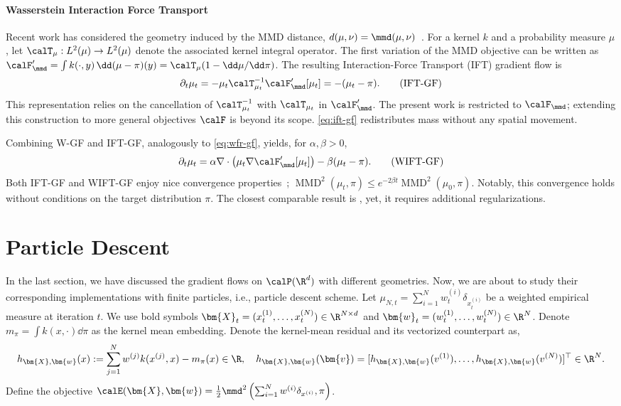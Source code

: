 \paragraph{Wasserstein Interaction Force Transport}
Recent work has considered the geometry induced by the MMD distance, $d(\mu,\nu)=\mmd(\mu,\nu)$~\citep{zhu2024inclusive,zhu2024kernel,gladin2024interaction}. For a kernel $k$ and a probability measure $\mu$, let $\calT_\mu:L^2(\mu)\to L^2(\mu)$ denote the associated kernel integral operator. The first variation of the MMD objective can be written as $\calF'_{\mmd}=\int k(\cdot,y)\,\dd(\mu-\pi)(y)=\calT_\mu(1-\dd\mu/\dd\pi)$. The resulting Interaction-Force Transport (IFT) gradient flow is~\citep{gladin2024interaction}
\begin{align}\label{eq:ift-gf}
\partial_t\mu_t = -\mu_t \calT_{\mu_t}^{-1} \calF_{\mmd}'[\mu_t] = -(\mu_t - \pi). \tag{IFT-GF}
\end{align}
This representation relies on the cancellation of $\calT_{\mu_t}^{-1}$ with $\calT_{\mu_t}$ in $\calF_{\mmd}'$. The present work is restricted to $\calF_{\mmd}$; extending this construction to more general objectives $\calF$ is beyond its scope. \eqref{eq:ift-gf} redistributes mass without any spatial movement. 

Combining W-GF and IFT-GF, analogously to \eqref{eq:wfr-gf}, yields, for $\alpha,\beta>0$, 
\begin{align*}
    \partial_t\mu_t = \alpha \nabla\cdot \left(\mu_t \nabla \calF_{\mmd}'[\mu_t]\right) - \beta (\mu_t - \pi) . \tag{WIFT-GF}
\end{align*}
Both IFT-GF and WIFT-GF enjoy nice convergence properties~\citep{gladin2024interaction}; $\operatorname{MMD}^2(\mu_t,\pi)\leq e^{-2\beta t}\operatorname{MMD}^2(\mu_0,\pi)$. Notably, this convergence holds without conditions on the target distribution $\pi$. The closest comparable result is \citet[Theorem 4.1]{tian2026sobolev}, yet, it requires additional regularizations.


\section{Particle Descent} 
In the last section, we have discussed the gradient flows on $\calP(\R^d)$ with different geometries. 
Now, we are about to study their corresponding implementations with finite particles, i.e., particle descent scheme. 
Let $\mu_{N,t}=\sum_{i=1}^N w_t^{(i)} \delta_{x_t^{(i)}}$ be a weighted empirical measure at iteration $t$. We use bold symbols $\bm{X}_t=(x_t^{(1)},\ldots, x_t^{(N)}) \in\R^{N\times d}$ and $\bm{w}_t=(w_t^{(1)},\ldots, w_t^{(N)})\in\R^N$.
Denote $m_\pi=\int k(x,\cdot)\dd \pi$ as the kernel mean embedding. 
Denote the kernel-mean residual and its vectorized counterpart as,  
\begin{align*}
h_{\bm{X},\bm{w}}(x) := \sum_{j=1}^N w^{(j)} k(x^{(j)},x)-m_\pi(x) \in \R, \quad h_{\bm{X},\bm{w}}(\bm{v}) = [h_{\bm{X},\bm{w}}(v^{(1)}), \ldots, h_{\bm{X},\bm{w}}(v^{(N)})]^\top \in \R^N .
\end{align*}
Define the objective $\calE(\bm{X},\bm{w}) = \frac{1}{2}\mmd^2\left(\sum_{i=1}^N w^{(i)}\delta_{x^{(i)}},\pi \right)$.


